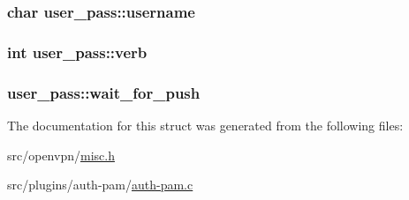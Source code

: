 \subsubsection[{username}]{\setlength{\rightskip}{0pt plus 5cm}char user\+\_\+pass\+::username}\label{structuser__pass_afd95ee9ee0c23614ce570b8bca3ad0e9}
\hypertarget{structuser__pass_a59e142b4f7004e19c5489dd37c1defa4}{}
\subsubsection[{verb}]{\setlength{\rightskip}{0pt plus 5cm}int user\+\_\+pass\+::verb}\label{structuser__pass_a59e142b4f7004e19c5489dd37c1defa4}
\hypertarget{structuser__pass_a62abbdabb5f55d97ee462fc616ffb6f5}{}
\subsubsection[{wait\+\_\+for\+\_\+push}]{ user\+\_\+pass\+::wait\+\_\+for\+\_\+push}\label{structuser__pass_a62abbdabb5f55d97ee462fc616ffb6f5}


The documentation for this struct was generated from the following files\+:\begin{DoxyCompactItemize}
\item 
src/openvpn/\hyperlink{misc_8h}{misc.\+h}\item 
src/plugins/auth-\/pam/\hyperlink{auth-pam_8c}{auth-\/pam.\+c}\end{DoxyCompactItemize}
